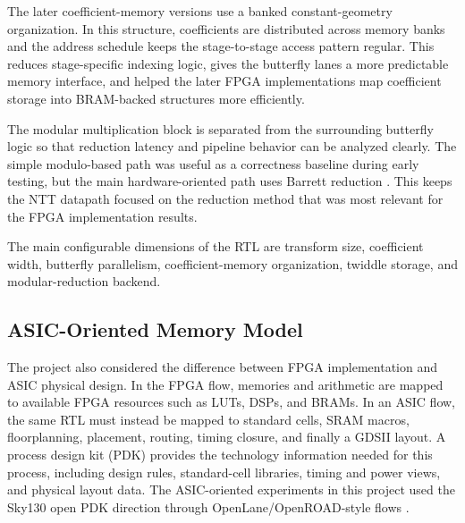 \documentclass[a4paper, 12pt, titlepage]{article}
\begin{document}
The later coefficient-memory versions use a banked constant-geometry
organization. In this structure, coefficients are distributed across memory
banks and the address schedule keeps the stage-to-stage access pattern regular.
This reduces stage-specific indexing logic, gives the butterfly lanes a more
predictable memory interface, and helped the later FPGA implementations map
coefficient storage into BRAM-backed structures more efficiently.

The modular multiplication block is separated from the surrounding butterfly
logic so that reduction latency and pipeline behavior can be analyzed clearly.
The simple modulo-based path was useful as a correctness baseline during early
testing, but the main hardware-oriented path uses Barrett reduction
\cite{kim-modmult}. This keeps the NTT datapath focused on the reduction
method that was most relevant for the FPGA implementation results.

The main configurable dimensions of the RTL are transform size, coefficient
width, butterfly parallelism, coefficient-memory organization, twiddle storage,
and modular-reduction backend.

\subsection{ASIC-Oriented Memory Model}

The project also considered the difference between FPGA implementation and ASIC
physical design. In the FPGA flow, memories and arithmetic are mapped to
available FPGA resources such as LUTs, DSPs, and BRAMs. In an ASIC flow, the
same RTL must instead be mapped to standard cells, SRAM macros, floorplanning,
placement, routing, timing closure, and finally a GDSII layout. A process
design kit (PDK) provides the technology information needed for this process,
including design rules, standard-cell libraries, timing and power views, and
physical layout data. The ASIC-oriented experiments in this project used the
Sky130 open PDK direction through OpenLane/OpenROAD-style flows
\cite{openlane}.
\end{document}
